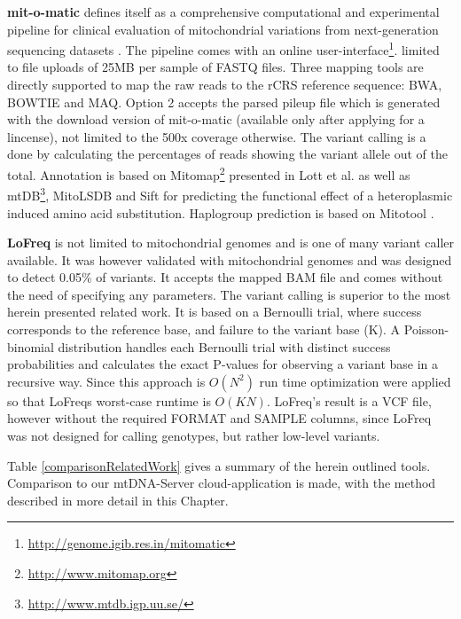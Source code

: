 \textbf{mit-o-matic} defines itself as a comprehensive computational and experimental pipeline for clinical evaluation of mitochondrial variations from next-generation sequencing datasets \cite{Vellarikkal2015}. The pipeline comes with an online user-interface\footnote{\url{http://genome.igib.res.in/mitomatic}}. limited to file uploads of 25MB per sample of FASTQ files. Three mapping tools are directly supported to map the raw reads to the rCRS reference sequence: BWA, BOWTIE and MAQ. Option 2 accepts the parsed pileup file which is generated with the download version of mit-o-matic (available only after applying for a lincense), not limited to the 500x coverage otherwise. The variant calling is a done by calculating the percentages of reads showing the variant allele out of the total. Annotation is based on Mitomap\footnote{\url{http://www.mitomap.org}} presented in Lott et al.\cite{Lott2013} as well as mtDB\footnote{\url{http://www.mtdb.igp.uu.se/}}, MitoLSDB \cite{K2013} and Sift for predicting the functional effect of a heteroplasmic induced amino acid substitution. Haplogroup prediction is based on Mitotool \cite{Fan2011,Fan2013}. 

\textbf{LoFreq} \cite{Wilm2012} is not limited to mitochondrial genomes and is one of many variant caller available. It was however validated with mitochondrial genomes and was designed to detect 0.05\% of variants. It accepts the mapped BAM file and comes without the need of specifying any parameters. The variant calling is superior to the most herein presented related work. It is based on a Bernoulli trial, where success corresponds to the reference base, and failure to the variant base (K). A Poisson-binomial distribution handles each Bernoulli trial with distinct success probabilities and calculates the exact P-values for observing a variant base in a recursive way. Since this approach is $O(N^2)$ run time optimization were applied so that LoFreqs worst-case runtime is $O(KN)$. LoFreq's result is a VCF file, however without the required FORMAT and SAMPLE columns, since LoFreq was not designed for calling genotypes, but rather low-level variants.

Table \ref{comparisonRelatedWork} gives a summary of the herein outlined tools. Comparison to our mtDNA-Server cloud-application is made, with the method described in more detail in this Chapter.

